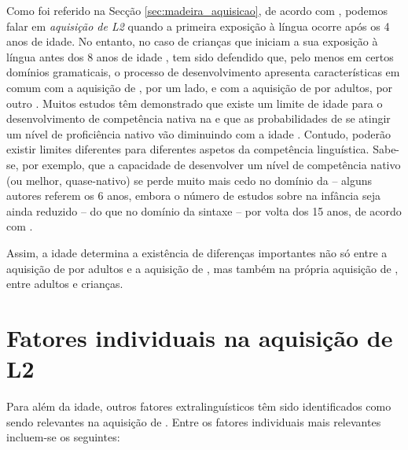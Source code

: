 \documentclass[output=paper]{LSP/langsci}
\begin{document}
Como foi referido na Secção \ref{sec:madeira_aquisicao}, de acordo com \citet{schwartz2004}, podemos falar em \textit{aquisição de L2} quando a primeira exposição à língua ocorre após os 4 anos de idade. No entanto, no caso de crianças que iniciam a sua exposição à língua antes dos 8 anos de idade \citep[3]{haznedargavruseva2008}, tem sido defendido que, pelo menos em certos domínios gramaticais, o processo de desenvolvimento apresenta características em comum com a aquisição de , por um lado, e com a aquisição de  por adultos, por outro \citep{schwartz2004}. Muitos estudos têm demonstrado que existe um limite de idade para o desenvolvimento de competência nativa na  e que as probabilidades de se atingir um nível de proficiência nativo vão diminuindo com a idade \citep{hylternstamabrahamsson2003}. Contudo, poderão existir limites diferentes para diferentes aspetos da competência linguística. Sabe-se, por exemplo, que a capacidade de desenvolver um nível de competência nativo (ou melhor, quase-nativo) se perde muito mais cedo no domínio da  – alguns autores referem os 6 anos, embora o número de estudos sobre  na infância seja ainda reduzido – do que no domínio da sintaxe – por volta dos 15 anos, de acordo com \citet{patkowski1980}.

Assim, a idade determina a existência de diferenças importantes não só entre a aquisição de  por adultos e a aquisição de , mas também na própria aquisição de , entre adultos e crianças. 

\section{Fatores individuais na aquisição de L2}
\label{sec:madeira_fatoreS_individuais}
Para além da idade, outros fatores extralinguísticos têm sido identificados como sendo relevantes na aquisição de  \citep{domyeiskehan2003}. Entre os fatores individuais mais relevantes incluem-se os seguintes:
\end{document}
